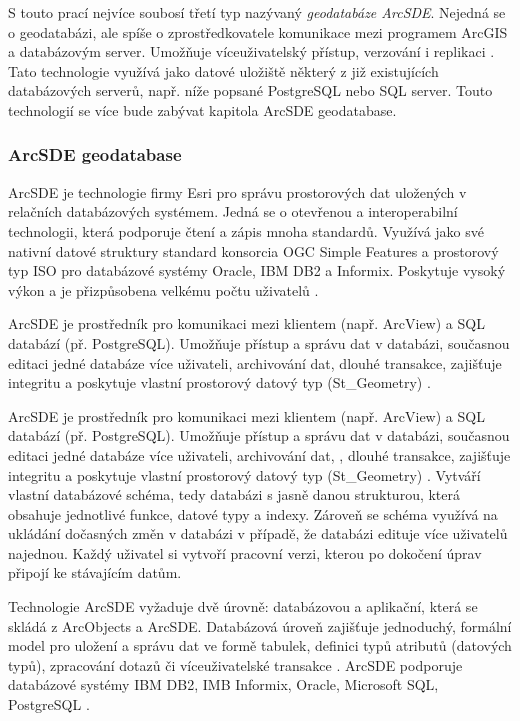         S touto prací nejvíce soubosí třetí typ nazývaný {\it geodatabáze ArcSDE}. Nejedná se o geodatabázi, ale spíše o zprostředkovatele komunikace mezi programem ArcGIS a databázovým server. Umožňuje víceuživatelský přístup, verzování i replikaci \citep{Esri2006}. Tato technologie využívá jako datové uložiště některý z již existujících databázových serverů, např. níže popsané PostgreSQL nebo SQL server. Touto technologií se více bude zabývat kapitola  ArcSDE geodatabase.

        \subsubsection{ArcSDE geodatabase}
        \label{kArcSDE}
        ArcSDE je technologie firmy Esri pro správu prostorových dat uložených v relačních databázových systémem. Jedná se o otevřenou a interoperabilní technologii, která podporuje čtení a zápis mnoha standardů. Využívá jako své nativní datové struktury standard konsorcia OGC Simple Features a prostorový typ ISO pro databázové systémy Oracle, IBM DB2 a Informix. Poskytuje vysoký výkon a je přizpůsobena velkému počtu uživatelů \citep{Esri2006}.

ArcSDE je prostředník pro komunikaci mezi klientem (např. ArcView) a SQL databází (př. PostgreSQL). Umožňuje přístup a správu dat v databázi, současnou editaci jedné databáze více uživateli, archivování  dat, dlouhé transakce, zajišťuje integritu a poskytuje vlastní prostorový datový typ (St\_Geometry) \citep{Law2008}. 

ArcSDE je prostředník pro komunikaci mezi klientem (např. ArcView) a SQL databází (př. PostgreSQL). Umožňuje přístup a správu dat v databázi, současnou editaci jedné databáze více uživateli, archivování  dat, , dlouhé transakce, zajišťuje integritu a poskytuje vlastní prostorový datový typ (St\_Geometry) \citep{Law2008}. 
Vytváří vlastní databázové schéma, tedy databázi s jasně danou strukturou, která obsahuje jednotlivé funkce, datové typy a indexy. Zároveň se schéma využívá na ukládání dočasných změn v databázi v případě, že databázi edituje více uživatelů najednou. Každý uživatel si vytvoří pracovní verzi, kterou po dokočení úprav připojí ke stávajícím datům.

Technologie ArcSDE vyžaduje dvě úrovně: databázovou a aplikační, která se skládá z ArcObjects a ArcSDE. Databázová úroveň zajišťuje jednoduchý, formální model pro uložení a správu dat ve formě tabulek, definici typů atributů (datových typů), zpracování dotazů či víceuživatelské transakce \citep{Law2008}. ArcSDE podporuje databázové systémy IBM DB2, IMB Informix, Oracle, Microsoft SQL, PostgreSQL \citep{Esri2013a}.

